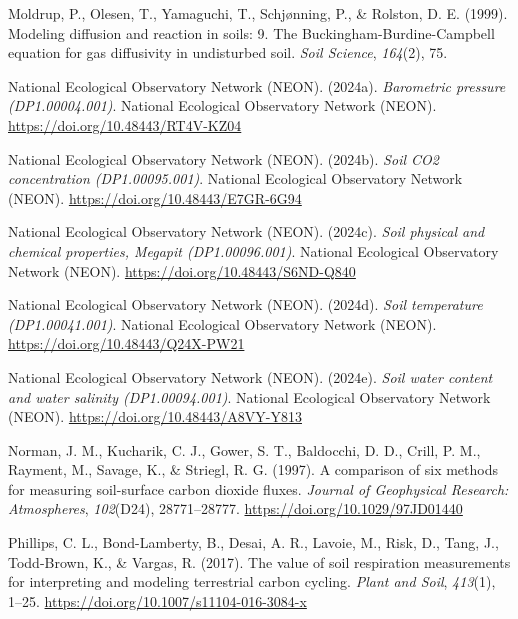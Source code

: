 \documentclass[
  letterpaper,
  DIV=11,
  numbers=noendperiod]{scrartcl}
\newlength{\cslhangindent}
\newenvironment{CSLReferences}[2] %
 {\begin{list}{}{%
  \setlength{\itemindent}{0pt}
  \setlength{\leftmargin}{0pt}
  \setlength{\parsep}{0pt}
  \ifodd #1
   \setlength{\leftmargin}{\cslhangindent}
   \setlength{\itemindent}{-1\cslhangindent}
  \fi
  \setlength{\itemsep}{#2\baselineskip}}}
 {\end{list}}
\begin{document}
\begin{CSLReferences}{1}{0}
Moldrup, P., Olesen, T., Yamaguchi, T., Schjønning, P., \& Rolston, D.
E. (1999). Modeling diffusion and reaction in soils: 9. {The
Buckingham-Burdine-Campbell} equation for gas diffusivity in undisturbed
soil. \emph{Soil Science}, \emph{164}(2), 75.

National Ecological Observatory Network (NEON). (2024a).
\emph{Barometric pressure ({DP1}.00004.001)}. National Ecological
Observatory Network (NEON). \url{https://doi.org/10.48443/RT4V-KZ04}

National Ecological Observatory Network (NEON). (2024b). \emph{Soil
{CO2} concentration ({DP1}.00095.001)}. National Ecological Observatory
Network (NEON). \url{https://doi.org/10.48443/E7GR-6G94}

National Ecological Observatory Network (NEON). (2024c). \emph{Soil
physical and chemical properties, {Megapit} ({DP1}.00096.001)}. National
Ecological Observatory Network (NEON).
\url{https://doi.org/10.48443/S6ND-Q840}

National Ecological Observatory Network (NEON). (2024d). \emph{Soil
temperature ({DP1}.00041.001)}. National Ecological Observatory Network
(NEON). \url{https://doi.org/10.48443/Q24X-PW21}

National Ecological Observatory Network (NEON). (2024e). \emph{Soil
water content and water salinity ({DP1}.00094.001)}. National Ecological
Observatory Network (NEON). \url{https://doi.org/10.48443/A8VY-Y813}

Norman, J. M., Kucharik, C. J., Gower, S. T., Baldocchi, D. D., Crill,
P. M., Rayment, M., Savage, K., \& Striegl, R. G. (1997). A comparison
of six methods for measuring soil-surface carbon dioxide fluxes.
\emph{Journal of Geophysical Research: Atmospheres}, \emph{102}(D24),
28771--28777. \url{https://doi.org/10.1029/97JD01440}

Phillips, C. L., Bond-Lamberty, B., Desai, A. R., Lavoie, M., Risk, D.,
Tang, J., Todd-Brown, K., \& Vargas, R. (2017). The value of soil
respiration measurements for interpreting and modeling terrestrial
carbon cycling. \emph{Plant and Soil}, \emph{413}(1), 1--25.
\url{https://doi.org/10.1007/s11104-016-3084-x}


\end{CSLReferences}
\end{document}
